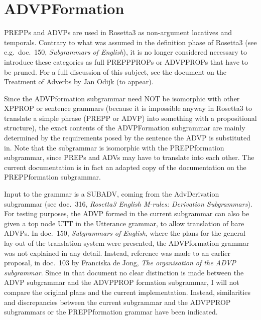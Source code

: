 
   \RosDate{\today}
   \RosSupersedes{-}
   \MakeRosTitle
%
%

\section{ADVPFormation}
PREPPs and ADVPs are used in Rosetta3 as non-argument locatives and temporals.
Contrary to what was assumed in the definition phase of Rosetta3 (see e.g.\ 
doc.\ 150, {\em Subgrammars of English\/}), it is no longer considered 
necessary to introduce these categories as full PREPPPROPs or ADVPPROPs that 
have to be pruned. For a full discussion of this subject, see the document on 
the Treatment of Adverbs by Jan Odijk (to appear).

Since the ADVPformation subgrammar need NOT be isomorphic with other XPPROP or 
sentence grammars
(because it is impossible anyway in Rosetta3 to translate a simple 
phrase (PREPP or ADVP) into something with a propositional structure),
the exact contents of the ADVPFormation subgrammar are mainly determined 
by the requirements posed by the sentence the ADVP is 
substituted in. Note that the 
subgrammar is isomorphic with the PREPPformation subgrammar, since PREPs and 
ADVs may have to translate into each other. The current documentation is in 
fact an adapted copy of the documentation on the PREPPformation subgrammar. 

Input to the grammar is a SUBADV, 
coming from the AdvDerivation subgrammar (see doc.\ 316, {\em Rosetta3 English 
M-rules: Derivation Subgrammars\/}). For testing purposes, the ADVP formed in 
the current subgrammar can also be given a top node UTT in the Utterance 
grammar, to allow translation of bare ADVPs. 
In doc.\ 150, {\em Subgrammars of English\/}, where the plans for the general 
lay-out of the translation system were presented, the ADVPformation grammar was 
not explained in any detail. Instead, reference was made to an earlier 
proposal, in doc.\ 103 by Franciska de Jong, {\em The organisation of the 
ADVP subgrammar\/}. Since in that document no clear distinction is made between 
the ADVP subgrammar and the ADVPPROP formation subgrammar, I will not compare 
the original plans and the current implementation. Instead, similarities and 
discrepancies between the current subgrammar and the ADVPPROP subgrammars or 
the PREPPformation grammar have been indicated. 

